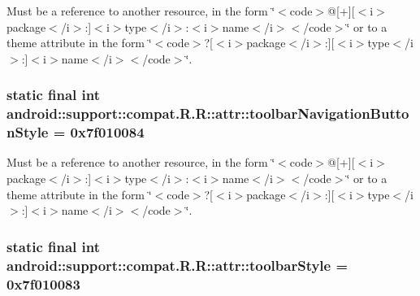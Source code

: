 Must be a reference to another resource, in the form \char`\"{}$<$code$>$@\mbox{[}+\mbox{]}\mbox{[}$<$i$>$package$<$/i$>$:\mbox{]}$<$i$>$type$<$/i$>$:$<$i$>$name$<$/i$>$$<$/code$>$\char`\"{} or to a theme attribute in the form \char`\"{}$<$code$>$?\mbox{[}$<$i$>$package$<$/i$>$:\mbox{]}\mbox{[}$<$i$>$type$<$/i$>$:\mbox{]}$<$i$>$name$<$/i$>$$<$/code$>$\char`\"{}. \hypertarget{classandroid_1_1support_1_1compat_1_1_r_1_1attr_fad682919e27c33cd1deae27a7672189}{
\subsubsection[{toolbarNavigationButtonStyle}]{\setlength{\rightskip}{0pt plus 5cm}static final int android::support::compat.R.R::attr::toolbarNavigationButtonStyle = 0x7f010084}}
\label{classandroid_1_1support_1_1compat_1_1_r_1_1attr_fad682919e27c33cd1deae27a7672189}


Must be a reference to another resource, in the form \char`\"{}$<$code$>$@\mbox{[}+\mbox{]}\mbox{[}$<$i$>$package$<$/i$>$:\mbox{]}$<$i$>$type$<$/i$>$:$<$i$>$name$<$/i$>$$<$/code$>$\char`\"{} or to a theme attribute in the form \char`\"{}$<$code$>$?\mbox{[}$<$i$>$package$<$/i$>$:\mbox{]}\mbox{[}$<$i$>$type$<$/i$>$:\mbox{]}$<$i$>$name$<$/i$>$$<$/code$>$\char`\"{}. \hypertarget{classandroid_1_1support_1_1compat_1_1_r_1_1attr_690eedcc686ba9a30e9ea35e4f7f1735}{
\subsubsection[{toolbarStyle}]{\setlength{\rightskip}{0pt plus 5cm}static final int android::support::compat.R.R::attr::toolbarStyle = 0x7f010083}}
\label{classandroid_1_1support_1_1compat_1_1_r_1_1attr_690eedcc686ba9a30e9ea35e4f7f1735}


